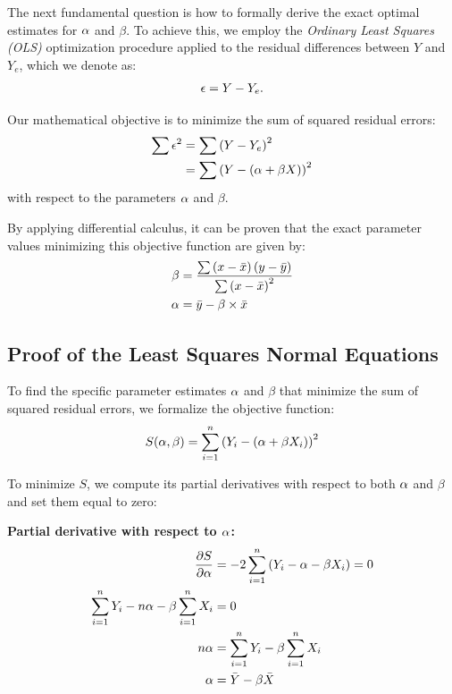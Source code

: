 The next fundamental question is how to formally derive the exact optimal estimates for $\alpha$ and $\beta$. To achieve this, we employ the \emph{Ordinary Least Squares (OLS)} optimization procedure applied to the residual differences between $Y$ and $Y_e$, which we denote as:
\begin{align}
	\epsilon = Y - Y_e.
\end{align}

Our mathematical objective is to minimize the sum of squared residual errors:
\begin{align}
	\sum \epsilon^2 &= \sum \left( Y - Y_e \right)^2\\
	&= \sum \left( Y - \left( \alpha + \beta X \right) \right)^2
\end{align}
with respect to the parameters $\alpha$ and $\beta$.

By applying differential calculus, it can be proven that the exact parameter values minimizing this objective function are given by:
\begin{align}
	\label{beta}
	\beta &= \dfrac{\sum \left( x - \bar{x} \right)\left( y - \bar{y} \right)}{\sum\left( x - \bar{x} \right)^2}\\
	\label{alfa}
	\alpha &= \bar{y} - \beta \times \bar{x}
\end{align}

\subsection{Proof of the Least Squares Normal Equations}

To find the specific parameter estimates $\alpha$ and $\beta$ that minimize the sum of squared residual errors, we formalize the objective function:
\begin{align}
	S(\alpha, \beta) = \sum_{i=1}^{n} \left( Y_i - (\alpha + \beta X_i) \right)^2
\end{align}

To minimize $S$, we compute its partial derivatives with respect to both $\alpha$ and $\beta$ and set them equal to zero:

\textbf{Partial derivative with respect to $\alpha$:}
\begin{align}
	\frac{\partial S}{\partial \alpha} &= -2 \sum_{i=1}^{n} \left( Y_i - \alpha - \beta X_i \right) = 0 \\
	\sum_{i=1}^{n} Y_i - n\alpha - \beta \sum_{i=1}^{n} X_i &= 0 \\
	n\alpha &= \sum_{i=1}^{n} Y_i - \beta \sum_{i=1}^{n} X_i \\
	\alpha &= \bar{Y} - \beta \bar{X}
\end{align}

